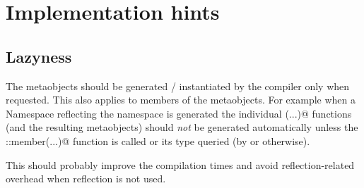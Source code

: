 \section{Implementation hints}

\subsection{Lazyness}

The metaobjects should be generated / instantiated by the compiler only
when requested. This also applies to members of the metaobjects. For example when a {\metaobject Namespace}
reflecting the \verb@std@ namespace is generated the individual \verb@member(...)@
functions (and the resulting metaobjects) should {\em not} be generated automatically
unless the \verb@Scope::member(...)@ function is called or its type queried (by \verb@decltype@
or otherwise).

This should probably improve the compilation times and avoid reflection-related
overhead when reflection is not used.
